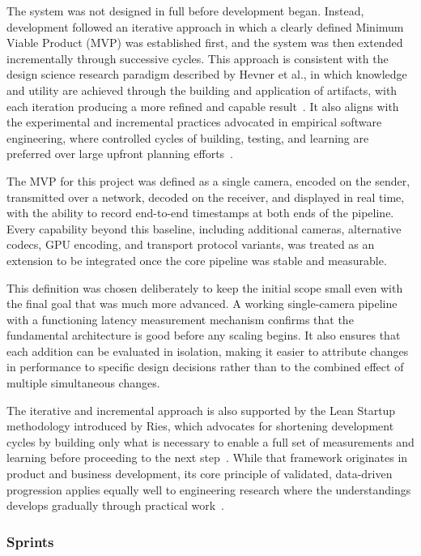 The system was not designed in full before development began. Instead, development followed an iterative approach in which a clearly defined Minimum Viable Product (MVP) was established first, and the system was then extended incrementally through successive cycles. This approach is consistent with the design science research paradigm described by Hevner et al., in which knowledge and utility are achieved through the building and application of artifacts, with each iteration producing a more refined and capable result~\cite{hevner2004}. It also aligns with the experimental and incremental practices advocated in empirical software engineering, where controlled cycles of building, testing, and learning are preferred over large upfront planning efforts~\cite{wohlin2012}.

The MVP for this project was defined as a single camera, encoded on the sender, transmitted over a network, decoded on the receiver, and displayed in real time, with the ability to record end-to-end timestamps at both ends of the pipeline. Every capability beyond this baseline, including additional cameras, alternative codecs, GPU encoding, and transport protocol variants, was treated as an extension to be integrated once the core pipeline was stable and measurable.

This definition was chosen deliberately to keep the initial scope small even with the final goal that was much more advanced. A working single-camera pipeline with a functioning latency measurement mechanism confirms that the fundamental architecture is good before any scaling begins. It also ensures that each addition can be evaluated in isolation, making it easier to attribute changes in performance to specific design decisions rather than to the combined effect of multiple simultaneous changes.

The iterative and incremental approach is also supported by the Lean Startup methodology introduced by Ries, which advocates for shortening development cycles by building only what is necessary to enable a full set of measurements and learning before proceeding to the next step~\cite{ries2011}. While that framework originates in product and business development, its core principle of validated, data-driven progression applies equally well to engineering research where the understandings develops gradually through practical work~\cite{saunders2019}.

\subsubsection{Sprints}

